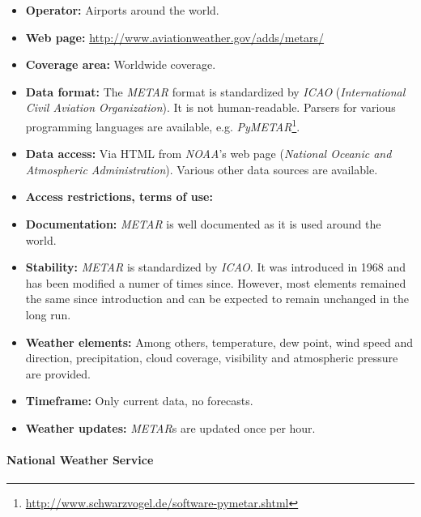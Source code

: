 \begin{itemize}
  \item \textbf{Operator:} Airports around the world.
  \item \textbf{Web page:} \href{http://www.aviationweather.gov/adds/metars/}{http://www.aviationweather.gov/adds/metars/}
  \item \textbf{Coverage area:} Worldwide coverage.
  \item \textbf{Data format:} The \emph{METAR} format is standardized by \emph{ICAO} (\emph{International Civil Aviation Organization}). It is not human-readable. Parsers for various programming languages are available, e.g. \emph{PyMETAR}\footnote{\href{http://www.schwarzvogel.de/software-pymetar.shtml}{http://www.schwarzvogel.de/software-pymetar.shtml}}.
  \item \textbf{Data access:} Via HTML from \emph{NOAA}'s web page (\emph{National Oceanic and Atmospheric Administration}). Various other data sources are available.
  \item \textbf{Access restrictions, terms of use:} %
  \item \textbf{Documentation:} \emph{METAR} is well documented as it is used around the world.
  \item \textbf{Stability:} \emph{METAR} is standardized by \emph{ICAO}. It was introduced in 1968 and has been modified a numer of times since. However, most elements remained the same since introduction and can be expected to remain unchanged in the long run.
  \item \textbf{Weather elements:} Among others, temperature, dew point, wind speed and direction, precipitation, cloud coverage, visibility and atmospheric pressure are provided.
  \item \textbf{Timeframe:} Only current data, no forecasts.
  \item \textbf{Weather updates:} \emph{METAR}s are updated once per hour.
\end{itemize}

\paragraph{National Weather Service}

